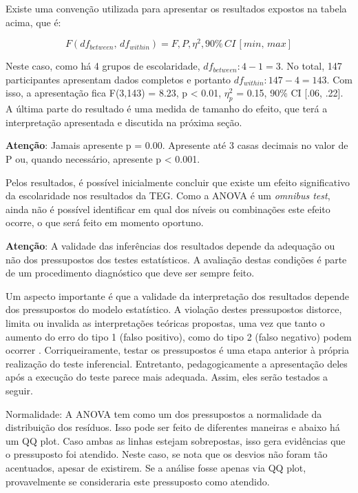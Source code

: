 \documentclass[
]{book}
\begin{document}
Existe uma convenção utilizada para apresentar os resultados expostos na tabela acima, que é:

\[F(df_{between}, \, df_{within}) = F, P, \eta^2, 90\% \,CI \, [min, \, max]\]

Neste caso, como há 4 grupos de escolaridade, \(df_{between}: 4-1=3\). No total, 147 participantes apresentam dados completos e portanto \(df_{within}: 147-4 = 143\). Com isso, a apresentação fica F(3,143) = 8.23, p \textless{} 0.01, \(\eta_p^2\) = 0.15, 90\% CI {[}.06, .22{]}. A última parte do resultado é uma medida de tamanho do efeito, que terá a interpretação apresentada e discutida na próxima seção.

\begin{warning}

\textbf{Atenção}: Jamais apresente p = 0.00. Apresente até 3 casas decimais no valor de P ou, quando necessário, apresente p \textless{} 0.001.

\end{warning}

Pelos resultados, é possível inicialmente concluir que existe um efeito significativo da escolaridade nos resultados da TEG. Como a ANOVA é um \emph{omnibus test}, ainda não é possível identificar em qual dos níveis ou combinações este efeito ocorre, o que será feito em momento oportuno.

\begin{warning}

\textbf{Atenção}: A validade das inferências dos resultados depende da adequação ou não dos pressupostos dos testes estatísticos. A avaliação destas condições é parte de um procedimento diagnóstico que deve ser sempre feito.

\end{warning}

Um aspecto importante é que a validade da interpretação dos resultados depende dos pressupostos do modelo estatístico. A violação destes pressupostos distorce, limita ou invalida as interpretações teóricas propostas, uma vez que tanto o aumento do erro do tipo 1 (falso positivo), como do tipo 2 (falso negativo) podem ocorrer \citep{Lix1996, Barker2015, Ernst2017}. Corriqueiramente, testar os pressupostos é uma etapa anterior à própria realização do teste inferencial. Entretanto, pedagogicamente a apresentação deles após a execução do teste parece mais adequada. Assim, eles serão testados a seguir.

Normalidade: A ANOVA tem como um dos pressupostos a normalidade da distribuição dos resíduos. Isso pode ser feito de diferentes maneiras e abaixo há um QQ plot. Caso ambas as linhas estejam sobrepostas, isso gera evidências que o pressuposto foi atendido. Neste caso, se nota que os desvios não foram tão acentuados, apesar de existirem. Se a análise fosse apenas via QQ plot, provavelmente se consideraria este pressuposto como atendido.
\end{document}
